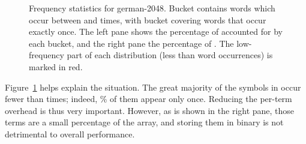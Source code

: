 \documentclass{llncs}
\begin{document}
\begin{figure}[t]
 \vspace*{-2mm}
\caption{Frequency statistics for german-2048.
Bucket  contains words which occur between  and 
times, with bucket  covering words that occur exactly once.
The left pane shows the percentage of  accounted for by each
bucket, and the right pane the percentage of .
The low-frequency part of each distribution (less than  word
occurrences) is marked in red.
\label{fig-context-stats}}
\end{figure}

Figure~\ref{fig-context-stats} helps explain the situation.
The great majority of the symbols in  occur fewer than
 times; indeed, \% of them appear only once.
Reducing the per-term overhead is thus very important.
However, as is shown in the right pane, those terms are a small
percentage of the  array, and storing them in binary is not
detrimental to overall performance.
\end{document}
